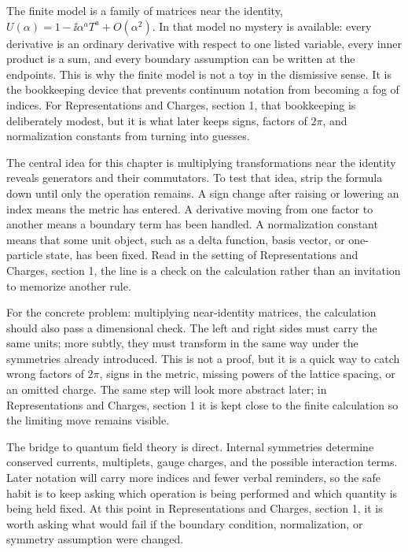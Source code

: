The finite model is a family of matrices near the identity, \(U(\alpha)=1-\ii\alpha^aT^a+O(\alpha^2)\).  In that model no mystery is available: every derivative is an ordinary derivative with respect to one listed variable, every inner product is a sum, and every boundary assumption can be written at the endpoints.  This is why the finite model is not a toy in the dismissive sense.  It is the bookkeeping device that prevents continuum notation from becoming a fog of indices.  For Representations and Charges, section 1, that bookkeeping is deliberately modest, but it is what later keeps signs, factors of \(2\pi\), and normalization constants from turning into guesses.

The central idea for this chapter is multiplying transformations near the identity reveals generators and their commutators.  To test that idea, strip the formula down until only the operation remains.  A sign change after raising or lowering an index means the metric has entered.  A derivative moving from one factor to another means a boundary term has been handled.  A normalization constant means that some unit object, such as a delta function, basis vector, or one-particle state, has been fixed.  Read in the setting of Representations and Charges, section 1, the line is a check on the calculation rather than an invitation to memorize another rule.

For the concrete problem: multiplying near-identity matrices, the calculation should also pass a dimensional check.  The left and right sides must carry the same units; more subtly, they must transform in the same way under the symmetries already introduced.  This is not a proof, but it is a quick way to catch wrong factors of \(2\pi\), signs in the metric, missing powers of the lattice spacing, or an omitted charge.  The same step will look more abstract later; in Representations and Charges, section 1 it is kept close to the finite calculation so the limiting move remains visible.

The bridge to quantum field theory is direct.  Internal symmetries determine conserved currents, multiplets, gauge charges, and the possible interaction terms.  Later notation will carry more indices and fewer verbal reminders, so the safe habit is to keep asking which operation is being performed and which quantity is being held fixed.  At this point in Representations and Charges, section 1, it is worth asking what would fail if the boundary condition, normalization, or symmetry assumption were changed.

